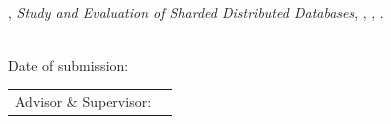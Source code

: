 
\thispagestyle{empty}

\ \vfill

\noindent%
\myName{}, \emph{Study and Evaluation of Sharded Distributed Databases}, \myDegree, \myUni{}, \myYearPublication{}.

\bigskip

\noindent\myMatrikelNummer{} \\
\noindent Date of submission: \myTime{}

\bigskip

\noindent\begin{tabular}{@{}l@{~}l@{}}
Advisor \& Supervisor: & \myProf{} \\
\end{tabular}

\bigskip

\noindent%
\mainDepartment{} \\
\myDepartment{} \\
\myFaculty{} \\
\myUni{}








